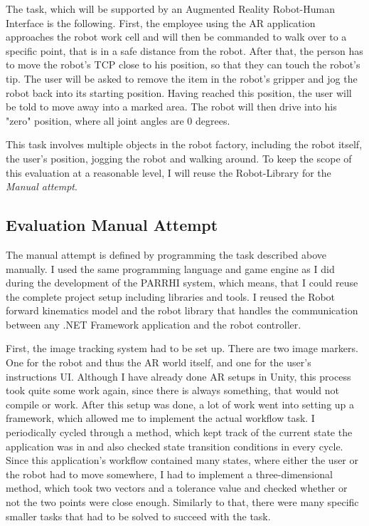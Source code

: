 The task, which will be supported by an Augmented Reality Robot-Human Interface is the following. First, the employee using the AR application approaches the robot work cell and will then be commanded to walk over to a specific point, that is in a safe distance from the robot. After that, the person has to move the robot's TCP close to his position, so that they can touch the robot's tip. The user will be asked to remove the item in the robot's gripper and jog the robot back into its starting position. Having reached this position, the user will be told to move away into a marked area. The robot will then drive into his "zero" position, where all joint angles are 0 degrees. 

This task involves multiple objects in the robot factory, including the robot itself, the user's position, jogging the robot and walking around. To keep the scope of this evaluation at a reasonable level, I will reuse the Robot-Library for the \textit{Manual attempt}. 


\subsection{Evaluation Manual Attempt}

The manual attempt is defined by programming the task described above manually. I used the same programming language and game engine as I did during the development of the PARRHI system, which means, that I could reuse the complete project setup including libraries and tools. I reused the Robot forward kinematics model and the robot library that handles the communication between any .NET Framework application and the robot controller. 

First, the image tracking system had to be set up. There are two image markers. One for the robot and thus the AR world itself, and one for the user's instructions UI. Although I have already done AR setups in Unity, this process took quite some work again, since there is always something, that would not compile or work. After this setup was done, a lot of work went into setting up a framework, which allowed me to implement the actual workflow task. I periodically cycled through a method, which kept track of the current state the application was in and also checked state transition conditions in every cycle. Since this application's workflow contained many states, where either the user or the robot had to move somewhere, I had to implement a three-dimensional  method, which took two vectors and a tolerance value and checked whether or not the two points were close enough. Similarly to that, there were many specific smaller tasks that had to be solved to succeed with the task.

